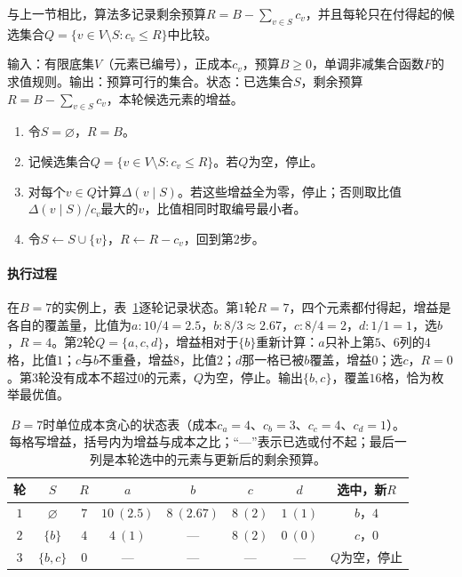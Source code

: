 与上一节相比，算法多记录剩余预算$R=B-\sum_{v\in S}c_v$，并且每轮只在付得起的候选集合$Q=\{v\in V\setminus S:c_v\leq R\}$中比较。

\begin{algorithm}[预算约束下的单位成本贪心]
\label{alg:graph-setfn-ratio-greedy}
输入：有限底集$V$（元素已编号），正成本$c_v$，预算$B\geq0$，单调非减集合函数$F$的求值规则。输出：预算可行的集合。状态：已选集合$S$，剩余预算$R=B-\sum_{v\in S}c_v$，本轮候选元素的增益。
\begin{enumerate}
  \item 令$S=\varnothing$，$R=B$。
  \item 记候选集合$Q=\{v\in V\setminus S:c_v\leq R\}$。若$Q$为空，停止。
  \item 对每个$v\in Q$计算$\Delta(v\mid S)$。若这些增益全为零，停止；否则取比值$\Delta(v\mid S)/c_v$最大的$v$，比值相同时取编号最小者。
  \item 令$S\leftarrow S\cup\{v\}$，$R\leftarrow R-c_v$，回到第2步。
\end{enumerate}
\end{algorithm}

\paragraph{执行过程}
在$B=7$的实例上，表~\ref{tab:graph-setfn-ratio-trace}逐轮记录状态。第$1$轮$R=7$，四个元素都付得起，增益是各自的覆盖量，比值为$a{:}10/4=2.5$，$b{:}8/3\approx2.67$，$c{:}8/4=2$，$d{:}1/1=1$，选$b$，$R=4$。第$2$轮$Q=\{a,c,d\}$，增益相对于$\{b\}$重新计算：$a$只补上第$5$、$6$列的$4$格，比值$1$；$c$与$b$不重叠，增益$8$，比值$2$；$d$那一格已被$b$覆盖，增益$0$；选$c$，$R=0$。第$3$轮没有成本不超过$0$的元素，$Q$为空，停止。输出$\{b,c\}$，覆盖$16$格，恰为枚举最优值。

\begin{table}[!htb]
  \centering
  \caption{$B=7$时单位成本贪心的状态表（成本$c_a=4$、$c_b=3$、$c_c=4$、$c_d=1$）。每格写增益，括号内为增益与成本之比；“—”表示已选或付不起；最后一列是本轮选中的元素与更新后的剩余预算。}
  \label{tab:graph-setfn-ratio-trace}
  \small
  \begin{tabular}{@{}cccccccc@{}}
    \toprule
    轮 & $S$ & $R$ & $a$ & $b$ & $c$ & $d$ & 选中，新$R$ \\
    \midrule
    $1$ & $\varnothing$ & $7$ & $10\ (2.5)$ & $8\ (2.67)$ & $8\ (2)$ & $1\ (1)$ & $b$，$4$ \\
    $2$ & $\{b\}$ & $4$ & $4\ (1)$ & — & $8\ (2)$ & $0\ (0)$ & $c$，$0$ \\
    $3$ & $\{b,c\}$ & $0$ & — & — & — & — & $Q$为空，停止 \\
    \bottomrule
  \end{tabular}
\end{table}

